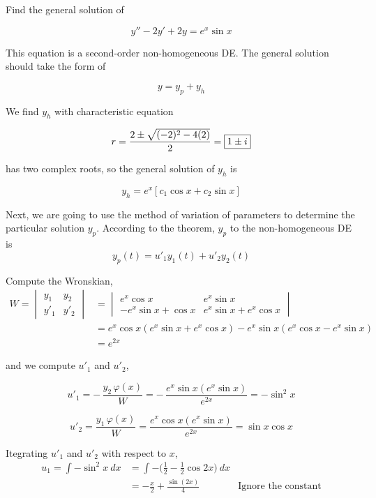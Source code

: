 \begin{example}
    Find the general solution of 

    \[
        y'' -2y' + 2y = e^x \sin x
    \]
\end{example}
\begin{solution}
    This equation is a second-order non-homogeneous DE. The general solution 
    should take the form of 
    
    \[
        y = y_p + y_h
    \]

    We find $y_h$ with characteristic equation 

    \[
        r = \frac{2 \pm \sqrt{(-2)^2 - 4(2)}}{2} = \fbox{$1 \pm i$}
    \]

    has two complex roots, so the general solution of $y_h$ is 

    \[
        y_h = e^{x}[c_1 \cos x + c_2 \sin x]
    \]
    
    Next, we are going to use the method of variation of parameters to determine the 
    particular solution $y_p$. According to the theorem, $y_p$ to the 
    non-homogeneous DE is 
    \[
        y_p(t) = u'_1 y_1(t) + u'_2 y_2(t)
    \]

    Compute the Wronskian,
    \begin{align*}
        W = \begin{vmatrix}
            y_1 & y_2 \\ y'_1 & y'_2
        \end{vmatrix}
        &= \begin{vmatrix}
            e^x \cos x & e^x \sin x \\ -e^x \sin x + \cos x & e^x \sin x + e^x \cos x
        \end{vmatrix}\\
        &= e^x \cos x (e^x \sin x + e^x \cos x) - e^x \sin x (e^x \cos x - e^x \sin x)\\
        &= e^{2x}
    \end{align*}

    and we compute $u'_1$ and $u'_2$,

    \[
        u'_1 = -\, \frac{y_2\, \varphi(x)}{W} = -\, \frac{e^x \sin x (e^x \sin x)}{e^{2x}} = - \sin^2 x
    \]

    \[
        u'_2 = \frac{y_1\, \varphi(x)}{W} = \frac{e^x \cos x (e^x \sin x)}{e^{2x}} = \sin x \cos x
    \]

    Itegrating $u'_1$ and $u'_2$ with respect to $x$,
    \begin{align*}
        u_1 = \int - \sin^2 x \> dx &= \int -\biggl( \frac{1}{2} - \frac{1}{2}\cos 2x \biggr) \> dx \\
        &= -\frac{x}{2} + \frac{\sin (2x)}{4} & \text{Ignore the constant}
    \end{align*}


\end{solution}

